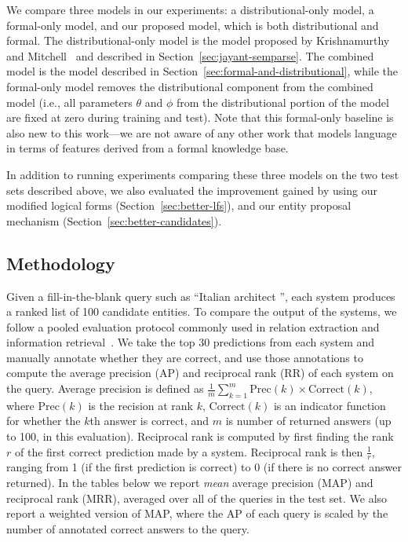 \documentclass[11pt]{article}
\newcommand{\secref}[1]{Section~\ref{sec:#1}}
\newcommand{\blank}{\underline{\hspace{.5cm}}}
\begin{document}
We compare three models in our experiments: a distributional-only model, a
formal-only model, and our proposed model, which is both distributional and
formal.  The distributional-only model is the model proposed by Krishnamurthy
and Mitchell~ and
described in \secref{jayant-semparse}.  The combined model is the model
described in \secref{formal-and-distributional}, while the formal-only
model removes the distributional component from the combined model (i.e., all
parameters $\theta$ and $\phi$ from the distributional portion of the model are
fixed at zero during training and test).  Note that this formal-only baseline
is also new to this work---we are not aware of any other work that models
language in terms of features derived from a formal knowledge base.

In addition to running experiments comparing these three models on the two test
sets described above, we also evaluated the improvement gained by using our
modified logical forms (\secref{better-lfs}), and our entity proposal mechanism
(\secref{better-candidates}).

\subsection{Methodology}

Given a fill-in-the-blank query such as ``Italian architect \blank{}'', each
system produces a ranked list of 100 candidate entities.  To compare the output
of the systems, we follow a pooled evaluation protocol commonly used in
relation extraction and information
retrieval~\cite{west-2014-kbc-via-qa,riedel-2013-mf-universal-schema}.  We take
the top 30 predictions from each system and manually annotate whether they are
correct, and use those annotations to compute the average precision (AP) and
reciprocal rank (RR) of each system on the query.  Average precision is defined
as $\frac{1}{m}\sum^m_{k=1} \mathrm{Prec}(k) \times \mathrm{Correct}(k)$, where
$\mathrm{Prec}(k)$ is the recision at rank $k$, $\mathrm{Correct}(k)$ is an
indicator function for whether the $k$th answer is correct, and $m$ is number
of returned answers (up to 100, in this evaluation).  Reciprocal rank is
computed by first finding the rank $r$ of the first correct prediction made by a
system.  Reciprocal rank is then $\frac{1}{r}$, ranging from 1 (if the first
prediction is correct) to 0 (if there is no correct answer returned).  In the
tables below we report \emph{mean} average precision (MAP) and reciprocal rank
(MRR), averaged over all of the queries in the test set.  We also report a
weighted version of MAP, where the AP of each query is scaled by the number of
annotated correct answers to the query.
\end{document}
